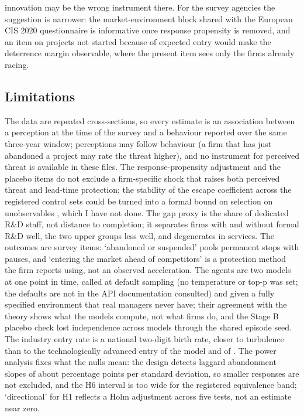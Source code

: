 \documentclass[preprint,12pt,authoryear]{elsarticle}
\begin{document}
innovation may be the wrong instrument there. For the survey agencies the suggestion is narrower: the market-environment block shared with the European CIS 2020 questionnaire is informative once response propensity is removed, and an item on projects not started because of expected entry would make the deterrence margin observable, where the present item sees only the \NQuitSample{} firms already racing.

\subsection{Limitations}

The data are repeated cross-sections, so every estimate is an association between a perception at the time of the survey and a behaviour reported over the same three-year window; perceptions may follow behaviour (a firm that has just abandoned a project may rate the threat higher), and no instrument for perceived threat is available in these files. The response-propensity adjustment and the placebo items do not exclude a firm-specific shock that raises both perceived threat and lead-time protection; the stability of the escape coefficient across the registered control sets could be turned into a formal bound on selection on unobservables \citep{oster2019unobservable}, which I have not done. The gap proxy is the share of dedicated R\&D staff, not distance to completion; it separates firms with and without formal R\&D well, the two upper groups less well, and degenerates in services. The outcomes are survey items: `abandoned or suspended' pools permanent stops with pauses, and `entering the market ahead of competitors' is a protection method the firm reports using, not an observed acceleration. The agents are two models at one point in time, called at default sampling (no temperature or top-p was set; the defaults are not in the API documentation consulted) and given a fully specified environment that real managers never have; their agreement with the theory shows what the models compute, not what firms do, and the Stage B placebo check lost independence across models through the shared episode seed. The industry entry rate is a national two-digit birth rate, closer to turbulence than to the technologically advanced entry of the model and of \citet{aghion2009entry}. The power analysis fixes what the nulls mean: the design detects laggard abandonment slopes of about \MDEQuitPp{} percentage points per standard deviation, so smaller responses are not excluded, and the H6 interval is too wide for the registered equivalence band; `directional' for H1 reflects a Holm adjustment across five tests, not an estimate near zero.
\end{document}
